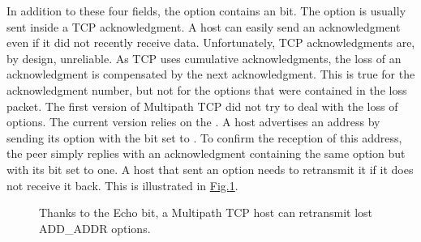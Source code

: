 \documentclass[letterpaper,10pt,english]{sphinxmanual}
\begin{document}
\sphinxAtStartPar
In addition to these four fields, the  option contains an  bit. The  option is usually sent inside a TCP acknowledgment. A host can easily send an acknowledgment even if it did not recently receive data. Unfortunately, TCP acknowledgments are, by design, unreliable. As TCP uses cumulative acknowledgments, the loss of an acknowledgment is compensated by the next acknowledgment. This is true for the acknowledgment number, but not for the options that were contained in the loss packet. The first version of Multipath TCP did not try to deal with the loss of  options. The current version relies on the . A host advertises an address by sending its  option with the  bit set to . To confirm the reception of this address, the peer simply replies with an acknowledgment containing the same option but with its  bit set to one. A host that sent an  option needs to retransmit it if it does not receive it back. This is illustrated in \hyperref[\detokenize{mptcp:fig-mptcp-addaddr}]{Fig.\@ \ref{\detokenize{mptcp:fig-mptcp-addaddr}}}.
\begin{figure}[htbp]\centering\capstart{}\caption{Thanks to the Echo bit, a Multipath TCP host can retransmit lost ADD\_ADDR options.}\label{\detokenize{mptcp:id66}}\label{\detokenize{mptcp:fig-mptcp-addaddr}}\end{figure}
\end{document}

